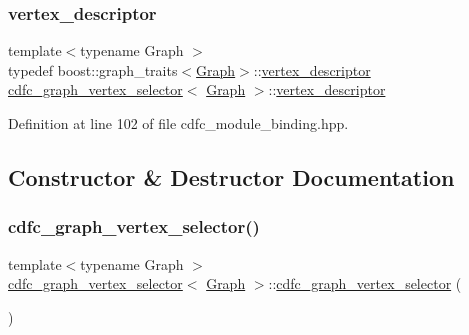 \subsubsection{\texorpdfstring{vertex\+\_\+descriptor}{vertex\_descriptor}}
{\footnotesize\ttfamily template$<$typename Graph $>$ \\
typedef boost\+::graph\+\_\+traits$<$\hyperlink{structGraph}{Graph}$>$\+::\hyperlink{structcdfc__graph__vertex__selector_a4cafbcfc2a2a46718e5a8330b56398fb}{vertex\+\_\+descriptor} \hyperlink{structcdfc__graph__vertex__selector}{cdfc\+\_\+graph\+\_\+vertex\+\_\+selector}$<$ \hyperlink{structGraph}{Graph} $>$\+::\hyperlink{structcdfc__graph__vertex__selector_a4cafbcfc2a2a46718e5a8330b56398fb}{vertex\+\_\+descriptor}}



Definition at line 102 of file cdfc\+\_\+module\+\_\+binding.\+hpp.



\subsection{Constructor \& Destructor Documentation}
\mbox{\label{structcdfc__graph__vertex__selector_aa46e72246164e7a4d3afd5d3f086da59}} 
\subsubsection{\texorpdfstring{cdfc\+\_\+graph\+\_\+vertex\+\_\+selector()}{cdfc\_graph\_vertex\_selector()}\hspace{0.1cm}{\footnotesize\ttfamily [1/2]}}
{\footnotesize\ttfamily template$<$typename Graph $>$ \\
\hyperlink{structcdfc__graph__vertex__selector}{cdfc\+\_\+graph\+\_\+vertex\+\_\+selector}$<$ \hyperlink{structGraph}{Graph} $>$\+::\hyperlink{structcdfc__graph__vertex__selector}{cdfc\+\_\+graph\+\_\+vertex\+\_\+selector} (\begin{DoxyParamCaption}{ }\end{DoxyParamCaption})\hspace{0.3cm}{\ttfamily [inline]}}




